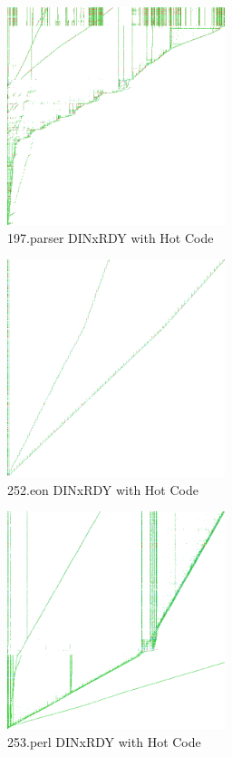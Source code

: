 \documentclass[defaultstyle,11pt]{thesis}
\begin{document}
\begin{figure}
  \centering
  \includegraphics[height=2.50in]{images/hotcode/197parserRunRef1_1000mil}
  \caption{197.parser DINxRDY with Hot Code}
  \label{fig:197parserhot}
\end{figure}

\begin{figure}
  \centering
  \includegraphics[height=2.50in]{images/hotcode/252eonRunRef1_1000mil}
  \caption{252.eon DINxRDY with Hot Code}
  \label{fig:252eonhot}
\end{figure}

\begin{figure}
  \centering
  \includegraphics[height=2.50in]{images/hotcode/253perlbmkRunRef1_1000mil}
  \caption{253.perl DINxRDY with Hot Code}
  \label{fig:253perlhot}
\end{figure}
\end{document}
